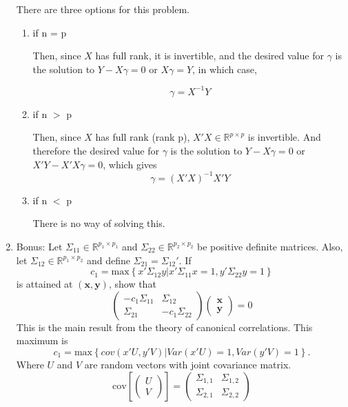 \documentclass{article}
\begin{document}
\begin{enumerate}
There are three options for this problem. 
\begin{enumerate}
\item if n = p

Then, since $X$ has full rank, it is invertible, and the desired value for $\gamma$ is 
the solution to $Y - X\gamma = 0$ or $X\gamma = Y$, in which case, 

$$\gamma = X^{-1} Y$$

\item if n $>$ p

Then, since $X$ has full rank (rank p), $X'X \in \mathbb{R}^{p \times p}$ 
is invertible. 
And therefore the desired value for $\gamma$ is the solution to 
$Y - X\gamma = 0$ or $X'Y - X'X\gamma = 0$, which gives $$\gamma = (X'X)^{-1}X'Y$$
\item if n $<$ p

There is no way of solving this.
 
\end{enumerate}


\item Bonus: Let $\Sigma_{11} \in \mathbb{R}^{p_1 \times p_1}$ and 
$\Sigma_{22} \in \mathbb{R}^{p_2 \times p_2}$ be positive definite matrices. 
Also, let $\Sigma_{12} \in \mathbb{R}^{p_1 \times p_2}$ and define 
$\Sigma_{21} = \Sigma_{12}\prime$. If 
$$
c_1 = 
\text{max}\left\{x'\Sigma_{12}y \left.\right| 
x'\Sigma_{11}x = 1, y'\Sigma_{22}y = 1\right\}
$$
is attained at $(\textbf{x}, \textbf{y})$, show that 
$$
\begin{pmatrix}
-c_1 \Sigma_{11} & \Sigma_{12} \\
\Sigma_{21} & -c_1 \Sigma_{22}
\end{pmatrix}
\begin{pmatrix}
\textbf{x} \\
\textbf{y}
\end{pmatrix}
= 0
$$
This is the main result from the theory of canonical correlations. This maximum is 
$$
c_1 = \text{max}\left\{cov(x'U,y'V)\left.\right|Var(x'U) = 1, Var(y'V) = 1\right\}.
$$
Where $U$ and $V$ are random vectors with joint covariance matrix.
$$
\text{cov}\left[\begin{pmatrix}U \\ V\end{pmatrix}\right] = 
\begin{pmatrix}
\Sigma_{1, 1} & \Sigma_{1, 2} \\
\Sigma_{2, 1} & \Sigma_{2, 2}
\end{pmatrix}
$$


\end{enumerate}
\end{document}
